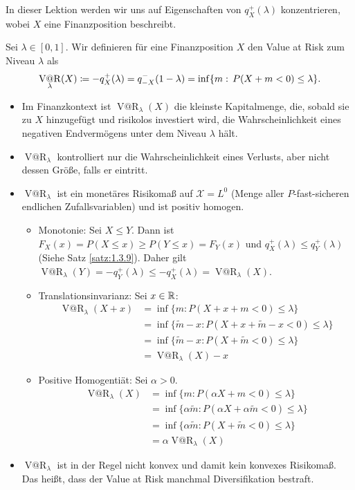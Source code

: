 \documentclass[a4paper,twoside,DIV15,BCOR12mm]{scrbook}
\makeatletter
\newcommand{\cX}{\mathcal X}
\DeclareMathOperator{\VatR}{V@R}
\makeatother
\begin{document}
In dieser Lektion werden wir uns auf Eigenschaften von $q_X^+(\lambda)$ konzentrieren, wobei $X$ eine Finanzposition beschreibt.

\begin{definition}
Sei $\lambda\in[0,1]$. Wir definieren für eine Finanzposition $X$ den Value at Risk zum Niveau $\lambda$ als 
\[
\VatR_\lambda(X) \da -q_X^+(\lambda)=q_{-X}^-(1-\lambda)=\inf\{m:\,  P(X+m<0)\leq \lambda\}.
\]
\end{definition}

\begin{bemerkung}
\begin{itemize}
\item Im Finanzkontext ist $\VatR_\lambda(X)$ die kleinste Kapitalmenge, die, sobald sie zu $X$ hinzugefügt und risikolos investiert wird, die Wahrscheinlichkeit eines negativen Endvermögens unter dem Niveau $\lambda$ hält.
\item $\VatR_\lambda$ kontrolliert nur die Wahrscheinlichkeit eines Verlusts, aber nicht dessen Größe, falls er eintritt.
\item $\VatR_\lambda$ ist ein monetäres Risikomaß auf $\cX=L^0$ (Menge aller $P$-fast-sicheren endlichen Zufallsvariablen) und ist positiv homogen.
\begin{beweis}
\begin{itemize}
\item Monotonie: Sei $X\le Y$. Dann ist $F_X(x) = P(X\le x) \ge P(Y\le x) = F_Y(x)$ und $q_X^+(\lambda) \le q_Y^+(\lambda)$ (Siehe Satz \ref{satz:1.3.9}). Daher gilt $\VatR_\lambda(Y) = -q_Y^+(\lambda) \le -q_X^+(\lambda) = \VatR_\lambda(X)$.
\item Translationsinvarianz: Sei $x\in\mathbb{R}$: 
\begin{align*}
\VatR_\lambda(X+x) &= \inf\{m: P(X + x + m < 0) \le \lambda \} \\
&= \inf\{\tilde m - x : P(X + x + \tilde m -x < 0)\le \lambda \} \\
&= \inf\{\tilde m - x : P(X+\tilde m < 0 ) \le \lambda\} \\
&= \VatR_\lambda(X) - x
\end{align*}
\item Positive Homogentiät: Sei $\alpha>0$.
\begin{align*}
\VatR_\lambda(X) &= \inf\{m:P(\alpha X+m<0)\le \lambda\} \\
&= \inf\{\alpha\tilde m : P(\alpha X + \alpha\tilde m<0) \le \lambda\} \\
&= \inf\{\alpha\tilde m : P(X+\tilde m < 0 ) \le \lambda\} \\
&= \alpha\VatR_\lambda(X)
\end{align*}
\end{itemize}
\end{beweis}

\item $\VatR_\lambda$ ist in der Regel nicht konvex und damit kein konvexes Risikomaß. Das heißt, dass der Value at Risk manchmal Diversifikation bestraft.
\end{itemize}
\end{bemerkung}
\end{document}
